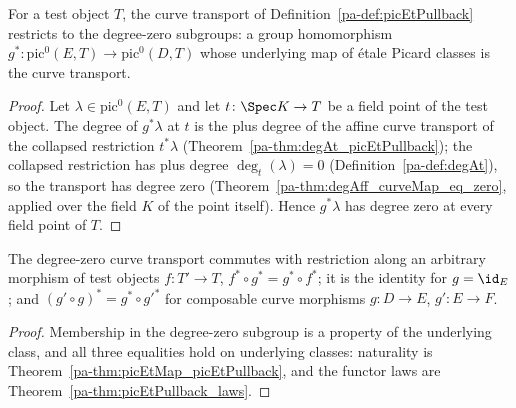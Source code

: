 \begin{definition}
  \label{pa-def:pic0Pullback}
  \leanok

  For a test object \(T\), the curve transport of Definition~\ref{pa-def:picEtPullback}
  restricts to the degree-zero subgroups: a group homomorphism
  \(g^{*} \colon \mathrm{pic}^0(E, T) \to \mathrm{pic}^0(D, T)\) whose underlying map
  of \'etale Picard classes is the curve transport.
\end{definition}
\begin{proof}
  \leanok
  Let \(\lambda \in \mathrm{pic}^0(E,T)\) and let \(t \colon \Spec K \to T\) be a field
  point of the test object. The degree of \(g^{*}\lambda\) at \(t\) is the plus degree
  of the affine curve transport of the collapsed restriction \(t^{*}\lambda\)
  (Theorem~\ref{pa-thm:degAt_picEtPullback}); the collapsed restriction has plus degree
  \(\deg_t(\lambda) = 0\) (Definition~\ref{pa-def:degAt}), so the transport has degree
  zero (Theorem~\ref{pa-thm:degAff_curveMap_eq_zero}, applied over the field \(K\) of the
  point itself). Hence \(g^{*}\lambda\) has degree zero at every field point of \(T\).
\end{proof}

\begin{theorem}
  \label{pa-thm:pic0Pullback_laws}
  \leanok

  The degree-zero curve transport commutes with restriction along an arbitrary
  morphism of test objects \(f \colon T' \to T\),
  \(f^{*} \circ g^{*} = g^{*} \circ f^{*}\); it is the identity for \(g = \id_E\); and
  \((g' \circ g)^{*} = g^{*} \circ g'^{*}\) for composable curve morphisms
  \(g \colon D \to E\), \(g' \colon E \to F\).
\end{theorem}
\begin{proof}
  \leanok
  Membership in the degree-zero subgroup is a property of the underlying class, and
  all three equalities hold on underlying classes: naturality is
  Theorem~\ref{pa-thm:picEtMap_picEtPullback}, and the functor laws are
  Theorem~\ref{pa-thm:picEtPullback_laws}.
\end{proof}

